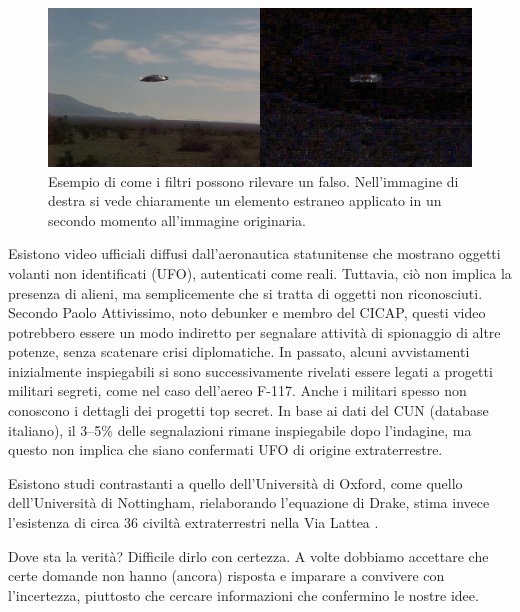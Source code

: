 \documentclass[12pt]{book} %
\begin{document}
\begin{mdframed}[linewidth=1pt]
\needspace{4cm}
\begin{figure}[H]
  \begin{minipage}{16cm}
    \includegraphics[width=16cm]{images/Libro-img053.jpg}
    \caption{Esempio di come i filtri possono rilevare un falso. Nell'immagine di destra si vede chiaramente un elemento estraneo applicato in un secondo momento all'immagine originaria.}
  \end{minipage}
\end{figure}

Esistono video ufficiali diffusi dall’aeronautica statunitense che mostrano oggetti volanti non identificati (UFO), autenticati come reali. Tuttavia, ciò non implica la presenza di alieni, ma semplicemente che si tratta di oggetti non riconosciuti. Secondo Paolo Attivissimo, noto debunker e membro del CICAP, questi video potrebbero essere un modo indiretto per segnalare attività di spionaggio di altre potenze, senza scatenare crisi diplomatiche. In passato, alcuni avvistamenti inizialmente inspiegabili si sono successivamente rivelati essere legati a progetti militari segreti, come nel caso dell’aereo F-117. Anche i militari spesso non conoscono i dettagli dei progetti top secret. In base ai dati del CUN (database italiano), il 3–5\% delle segnalazioni rimane inspiegabile dopo l’indagine, ma questo non implica che siano confermati UFO di origine extraterrestre.

Esistono studi contrastanti a quello dell’Università di Oxford, come quello dell’Università di Nottingham, rielaborando l’equazione di Drake, stima invece l’esistenza di circa 36 civiltà extraterrestri nella Via Lattea .

Dove sta la verità? Difficile dirlo con certezza. A volte dobbiamo accettare che certe domande non hanno (ancora) risposta e imparare a convivere con l’incertezza, piuttosto che cercare informazioni che confermino le nostre idee.
\end{mdframed}
\end{document}
